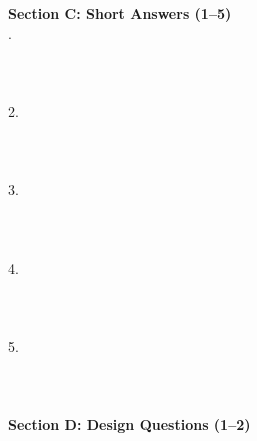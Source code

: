 \documentclass{USTBExam}
\begin{document}
\vspace{0.6cm}
\noindent\textbf{Section C: Short Answers (1--5)}\\[0.2cm]
.\ \underline{\hspace{17cm}}\\[0.35cm]
\underline{\hspace{17cm}}\\[0.5cm]
\underline{\hspace{17cm}}\\[0.5cm]
\underline{\hspace{17cm}}\\[0.5cm]
2.\ \underline{\hspace{17cm}}\\[0.35cm]
\underline{\hspace{17cm}}\\[0.5cm]
\underline{\hspace{17cm}}\\[0.5cm]
\underline{\hspace{17cm}}\\[0.5cm]
3.\ \underline{\hspace{17cm}}\\[0.35cm]
\underline{\hspace{17cm}}\\[0.5cm]
\underline{\hspace{17cm}}\\[0.5cm]
\underline{\hspace{17cm}}\\[0.5cm]
4.\ \underline{\hspace{17cm}}\\[0.35cm]
\underline{\hspace{17cm}}\\[0.5cm]
\underline{\hspace{17cm}}\\[0.5cm]
\underline{\hspace{17cm}}\\[0.5cm]
5.\ \underline{\hspace{17cm}}\\[0.35cm]
\underline{\hspace{17cm}}\\[0.5cm]
\underline{\hspace{17cm}}\\[0.5cm]
\underline{\hspace{17cm}}\\[0.5cm]
\vspace{0.6cm}
\noindent\textbf{Section D: Design Questions (1--2)}\\[0.2cm]
\end{document}
